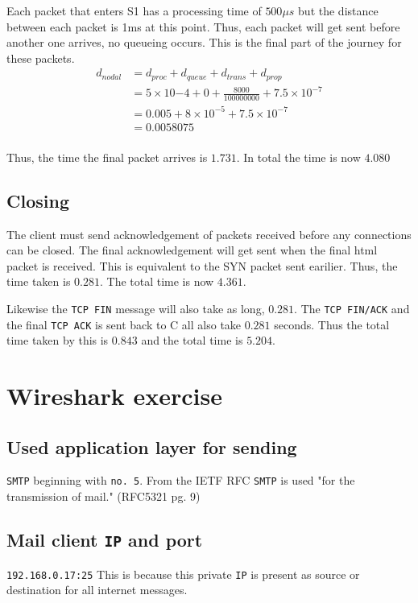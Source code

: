 \documentclass{article}
\begin{document}
Each packet that enters S1 has a processing time of $500\mu s$ but the distance
between each packet is 1ms at this point. Thus, each packet will get sent
before another one arrives, no queueing occurs. This is the final part of the
journey for these packets.
\begin{align*}
    d_{nodal} &= d_{proc} + d_{queue} + d_{trans} + d_{prop} \\
    &= 5 \times 10{-4} + 0 + \frac{8000}{100000000} + 7.5 \times 10^{-7} \\
    &= 0.005 + 8 \times 10^{-5} + 7.5 \times 10^{-7} \\
    &= 0.0058075 \\
\end{align*}

Thus, the time the final packet arrives is $1.731$. In total the time is now
$4.080$

\subsection{Closing}
The client must send acknowledgement of packets received before any connections
can be closed. The final acknowledgement will get sent when the final html
packet is received. This is equivalent to the SYN packet sent earilier.
Thus, the time taken is $0.281$. The total time is now $4.361$.

Likewise the \texttt{TCP FIN} message will also take as long, $0.281$. The
\texttt{TCP FIN/ACK} and the final \texttt{TCP ACK} is sent back to C all
also take $0.281$ seconds. Thus the total time taken by this is $0.843$ and
the total time is $5.204$.

\section{Wireshark exercise}
\subsection{Used application layer for sending}
\texttt{SMTP} beginning with \texttt{no. 5}. From the IETF RFC \texttt{SMTP}
is used "for the transmission of mail." (RFC5321 pg. 9)

\subsection{Mail client \texttt{IP} and port}
\texttt{192.168.0.17:25} This is because this private \texttt{IP} is present
as source or destination for all internet messages.
\end{document}
